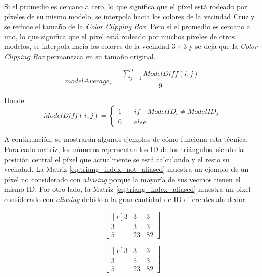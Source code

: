 \documentclass[pregrado]{tesis-usb} %
\begin{document}
Si el promedio es cercano a cero, lo que significa que el píxel está rodeado por píxeles de su mismo modelo, se interpola hacia los colores de la vecindad Cruz y se reduce el tamaño de la \textit{Color Clipping Box}. Pero si el promedio es cercano a uno, lo que significa que el píxel está rodeado por muchos píxeles de otros modelos, se interpola hacia los colores de la vecindad $3\times 3$ y se deja que la \textit{Color Clipping Box} permanezca en su tamaño original.

\begin{equation}\label{eq:model_index_acc}
modelAverage_i = \frac{\sum\limits_{j=1}^{9} ModelDiff(i,j)}{9} 
\end{equation}

Donde
\begin{equation*}
ModelDiff(i,j) = \left\lbrace \begin{split}1\quad & if\quad ModelID_i \neq ModelID_j \\ 0\quad & else\end{split} \right.
\end{equation*}

A continuación, se mostrarán algunos ejemplos de cómo funciona esta técnica. Para cada matriz, los números representan los ID de los triángulos, siendo la posición central el píxel que actualmente se está calculando y el resto su vecindad. La Matriz \ref{eq:triang_index_not_aliased} muestra un ejemplo de un píxel no considerado con \textit{aliasing} porque la mayoría de sus vecinos tienen el mismo ID. Por otro lado, la Matriz \ref{eq:triang_index_aliased} muestra un pixel considerado con \textit{aliasing} debido a la gran cantidad de ID diferentes alrededor.

\begin{equation}
\begin{bmatrix*}[r]\label{eq:triang_index_not_aliased}
3 &  3 & 3 \\
3 &  3 & 3 \\
5 &  23 & 82
\end{bmatrix*}
\end{equation}

\begin{equation}
\begin{bmatrix*}[r]\label{eq:triang_index_aliased}
3 &  3 & 3 \\
3 &  5 & 3 \\
5 &  23 & 82
\end{bmatrix*}
\end{equation}
\end{document}
